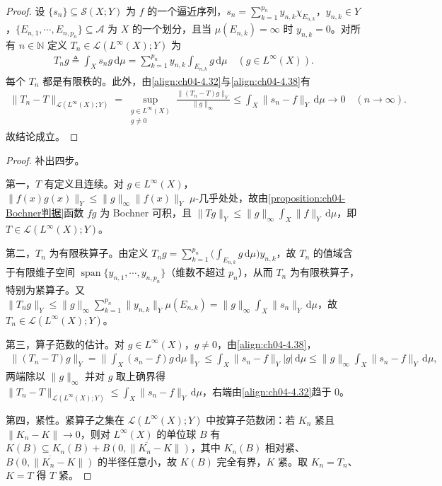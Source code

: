 \documentclass[../../main.tex]{subfiles}%
\begin{document}
\begin{proof}
设 $\{s_n\}\subseteq\mathcal{S}(X;Y)$ 为 $f$ 的一个逼近序列，$s_n=\sum_{k=1}^{p_n}y_{n,k}\chi_{E_{n,k}}$，$y_{n,k}\in Y$，$\{E_{n,1},\cdots ,E_{n,p_n}\}\subseteq\mathcal{A}$ 为 $X$ 的一个划分，且当 $\mu(E_{n,k})=\infty$ 时 $y_{n,k}=0$。对所有 $n\in\mathbb{N}$ 定义 $T_n\in\mathcal{L}(L^\infty(X);Y)$ 为
\begin{align*}
T_ng\triangleq \int_X s_ng\,\mathrm{d}\mu=\sum_{k=1}^{p_n}y_{n,k}\int_{E_{n,k}}g\,\mathrm{d}\mu\quad(g\in L^\infty(X)).
\end{align*}
每个 $T_n$ 都是有限秩的。此外，由\eqref{align:ch04-4.32}与\eqref{align:ch04-4.38}有
\begin{align*}
\|T_n-T\|_{\mathcal{L}(L^\infty(X);Y)}=\sup_{\substack{g\in L^\infty(X)\\g\neq0}}\frac{\|(T_n-T)g\|_Y}{\|g\|_\infty}\leqslant\int_X\|s_n-f\|_Y\,\mathrm{d}\mu\to0\quad(n\to\infty).
\end{align*}
故结论成立。
\end{proof}

\begin{proof}
补出四步。

第一，$T$ 有定义且连续。对 $g\in L^\infty(X)$，$\|f(x)g(x)\|_Y\leqslant\|g\|_\infty\|f(x)\|_Y$ $\mu$-几乎处处，故由\cref{proposition:ch04-Bochner判据}函数 $fg$ 为 Bochner 可积，且 $\|Tg\|_Y\leqslant\|g\|_\infty\int_X\|f\|_Y\,\mathrm{d}\mu$，即 $T\in\mathcal{L}(L^\infty(X);Y)$。

第二，$T_n$ 为有限秩算子。由定义 $T_ng=\sum_{k=1}^{p_n}\big(\int_{E_{n,k}}g\,\mathrm{d}\mu\big)y_{n,k}$，故 $T_n$ 的值域含于有限维子空间 $\operatorname{span}\{y_{n,1},\cdots ,y_{n,p_n}\}$（维数不超过 $p_n$），从而 $T_n$ 为有限秩算子，特别为紧算子。又 $\|T_ng\|_Y\leqslant\|g\|_\infty\sum_{k=1}^{p_n}\|y_{n,k}\|_Y\mu(E_{n,k})=\|g\|_\infty\int_X\|s_n\|_Y\,\mathrm{d}\mu$，故 $T_n\in\mathcal{L}(L^\infty(X);Y)$。

第三，算子范数的估计。对 $g\in L^\infty(X)$，$g\neq0$，由\eqref{align:ch04-4.38}，
\begin{align*}
\|(T_n-T)g\|_Y=\Big\|\int_X(s_n-f)g\,\mathrm{d}\mu\Big\|_Y\leqslant\int_X\|s_n-f\|_Y|g|\,\mathrm{d}\mu\leqslant\|g\|_\infty\int_X\|s_n-f\|_Y\,\mathrm{d}\mu,
\end{align*}
两端除以 $\|g\|_\infty$ 并对 $g$ 取上确界得 $\|T_n-T\|_{\mathcal{L}(L^\infty(X);Y)}\leqslant\int_X\|s_n-f\|_Y\,\mathrm{d}\mu$，右端由\eqref{align:ch04-4.32}趋于 $0$。

第四，紧性。紧算子之集在 $\mathcal{L}(L^\infty(X);Y)$ 中按算子范数闭：若 $K_n$ 紧且 $\|K_n-K\|\to0$，则对 $L^\infty(X)$ 的单位球 $B$ 有 $K(B)\subseteq K_n(B)+\overline{B(0,\|K_n-K\|)}$，其中 $K_n(B)$ 相对紧、$\overline{B(0,\|K_n-K\|)}$ 的半径任意小，故 $K(B)$ 完全有界，$K$ 紧。取 $K_n=T_n$、$K=T$ 得 $T$ 紧。
\end{proof}
\end{document}

